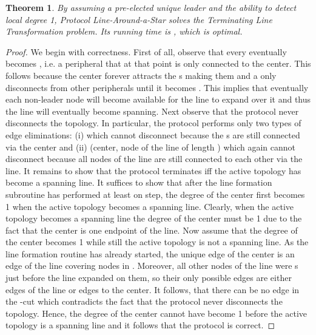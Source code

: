 \documentclass[preprint]{elsarticle}
\newtheorem{theorem}{Theorem}
\begin{document}
\begin{theorem}
By assuming a pre-elected unique leader and the ability to detect local degree 1, Protocol Line-Around-a-Star solves the Terminating Line Transformation problem. Its running time is , which is optimal.
\end{theorem}
\begin{proof}
We begin with correctness. First of all, observe that every  eventually becomes , i.e. a peripheral that at that point is only connected to the center. This follows because the center forever attracts the s making them  and a  only disconnects from other peripherals until it becomes . This implies that eventually each non-leader node will become available for the line to expand over it and thus the line will eventually become spanning. Next observe that the protocol never disconnects the topology. In particular, the protocol performs only two types of edge eliminations: (i)  which cannot disconnect because the s are still connected via the center and (ii) (center, node  of the line of length ) which again cannot disconnect because all nodes of the line are still connected to each other via the line. It remains to show that the protocol terminates iff the active topology has become a spanning line. It suffices to show that after the line formation subroutine has performed at least on step, the degree of the center first becomes 1 when the active topology becomes a spanning line. Clearly, when the active topology becomes a spanning line the degree of the center must be 1 due to the fact that the center is one endpoint of the line. Now assume that the degree of the center becomes 1 while still the active topology is not a spanning line. As the line formation routine has already started, the unique edge of the center is an edge of the line covering nodes in . Moreover, all other nodes of the line were s just before the line expanded on them, so their only possible edges are either edges of the line or edges to the center. It follows, that there can be no edge in the -cut which contradicts the fact that the protocol never disconnects the topology. Hence, the degree of the center cannot have become 1 before the active topology is a spanning line and it follows that the protocol is correct.


\end{proof}
\end{document}

